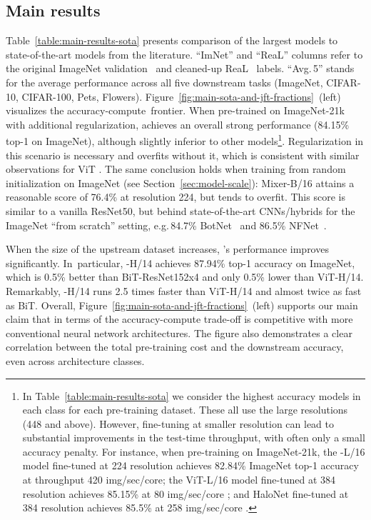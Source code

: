 \subsection{Main results}
\label{subsec:main-results}

Table~\ref{table:main-results-sota} presents comparison of the largest \name{} models to state-of-the-art models from the literature.
``ImNet'' and ``ReaL'' columns refer to the original ImageNet validation~\citep{deng2009-imagenet} and cleaned-up ReaL~\citep{beyer2020-imagenet} labels.
``Avg.\,5'' stands for the average performance across all five downstream tasks (ImageNet, CIFAR-10, CIFAR-100, Pets, Flowers).
Figure~\ref{fig:main-sota-and-jft-fractions}~(left) visualizes the accuracy-compute~frontier.
%
When pre-trained on ImageNet-21k with additional regularization, \name{} achieves an overall strong performance (84.15\% top-1 on ImageNet), although slightly inferior to other models\footnote{
In Table~\ref{table:main-results-sota} we consider the highest accuracy models in each class for each pre-training dataset.
These all use the large resolutions (448 and above).
However, fine-tuning at smaller resolution can lead to substantial improvements in the test-time throughput, with often only a small accuracy penalty.
For instance, when pre-training on ImageNet-21k,
the \name{}-L/16 model fine-tuned at 224 resolution achieves 82.84\% ImageNet top-1 accuracy at throughput 420 img/sec/core;
the ViT-L/16 model fine-tuned at 384 resolution achieves 85.15\% at 80 img/sec/core \cite{Dosovitskiy2021};
and HaloNet fine-tuned at 384 resolution achieves 85.5\% at 258 img/sec/core \cite{vaswani2021scaling}.
}.
Regularization in this scenario is necessary and \name{} overfits without it, which is consistent with similar observations for ViT \cite{Dosovitskiy2021}.
The same conclusion holds when training \name{} from random initialization on ImageNet (see Section~\ref{sec:model-scale}):
Mixer-B/16 attains a reasonable score of 76.4\% at resolution 224, but tends to overfit.
This score is similar to a vanilla ResNet50, but behind state-of-the-art CNNs/hybrids for the ImageNet ``from scratch'' setting, e.g.\,84.7\% BotNet~\cite{srinivas2021bottleneck} and 86.5\%
NFNet~\cite{brock2021high}.

When the size of the upstream dataset increases, \name{}'s performance improves significantly.
In~particular, \name{}-H/14 achieves 87.94\% top-1 accuracy on ImageNet, which is 0.5\% better than BiT-ResNet152x4 and only 0.5\% lower than ViT-H/14.
Remarkably, \name{}-H/14 runs 2.5 times faster than ViT-H/14 and almost twice as fast as BiT. 
Overall, Figure~\ref{fig:main-sota-and-jft-fractions}~(left) supports our main claim that in terms of the accuracy-compute trade-off \name{} is competitive with more conventional neural network architectures. The figure also demonstrates a clear correlation between the total pre-training cost and the downstream accuracy, even across architecture classes.

